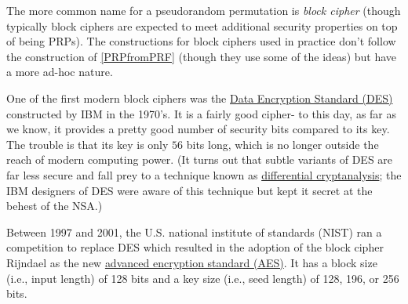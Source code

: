 \hypertarget{feistelrounds}{}

The more common name for a pseudorandom permutation is \emph{block
cipher} (though typically block ciphers are expected to meet additional
security properties on top of being PRPs). The constructions for block
ciphers used in practice don't follow the construction of
\cref{PRPfromPRF} (though they use some of the ideas) but have a more
ad-hoc nature.

One of the first modern block ciphers was the
\href{https://goo.gl/XiCvjs}{Data Encryption Standard (DES)} constructed
by IBM in the 1970's. It is a fairly good cipher- to this day, as far as
we know, it provides a pretty good number of security bits compared to
its key. The trouble is that its key is only \(56\) bits long, which is
no longer outside the reach of modern computing power. (It turns out
that subtle variants of DES are far less secure and fall prey to a
technique known as \href{https://goo.gl/GAvbh8}{differential
cryptanalysis}; the IBM designers of DES were aware of this technique
but kept it secret at the behest of the NSA.)

Between 1997 and 2001, the U.S. national institute of standards (NIST)
ran a competition to replace DES which resulted in the adoption of the
block cipher Rijndael as the new \href{https://goo.gl/1HnqFb}{advanced
encryption standard (AES)}. It has a block size (i.e., input length) of
128 bits and a key size (i.e., seed length) of 128, 196, or 256 bits.

